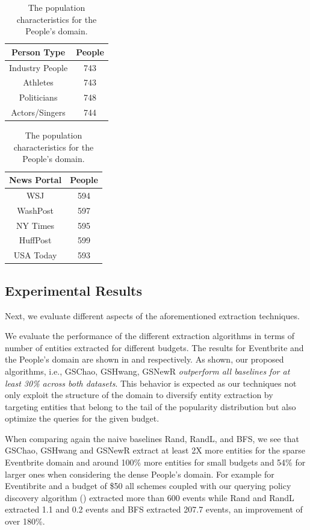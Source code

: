 \begin{table}
\scriptsize\center
\caption{The population characteristics for the People's domain.}
\label{tab:ptypedata}
\begin{tabular}{|c|c|}
\hline
\textbf{Person Type} & \textbf{People} \\ \hline
Industry People & 743 \\
Athletes & 743 \\
Politicians & 748 \\
Actors/Singers & 744 \\ \hline
\end{tabular}
\quad
\begin{tabular}{|c|c|}
\hline
\textbf{News Portal} & \textbf{People} \\ \hline
WSJ & 594 \\
WashPost & 597 \\
NY Times & 595 \\
HuffPost & 599 \\
USA Today & 593 \\ \hline
\end{tabular}
\vspace{-15pt}
\end{table}

\subsection{Experimental Results}
Next, we evaluate different aspects of the aforementioned extraction techniques. 

\vspace{2pt}
We evaluate the performance of the different extraction algorithms in terms of number of entities extracted for different budgets. The results for Eventbrite and the People's domain are shown in  and  respectively. As shown, our proposed algorithms, i.e., GSChao, GSHwang, GSNewR {\em outperform all baselines for at least 30\% across both datasets}. This behavior is expected as our techniques not only exploit the structure of the domain to diversify entity extraction by targeting entities that belong to the tail of the popularity distribution but also optimize the queries for the given budget.

When comparing again the naive baselines Rand, RandL, and BFS, we see that GSChao, GSHwang and GSNewR extract at least 2X more entities for the sparse Eventbrite domain and around 100\% more entities for small budgets and 54\% for larger ones when considering the dense People's domain. For example for Eventibrite and a budget of \$50 all schemes coupled with our querying policy discovery algorithm () extracted more than 600 events while Rand and RandL extracted 1.1 and 0.2 events and BFS extracted 207.7 events, an improvement of over 180\%.

